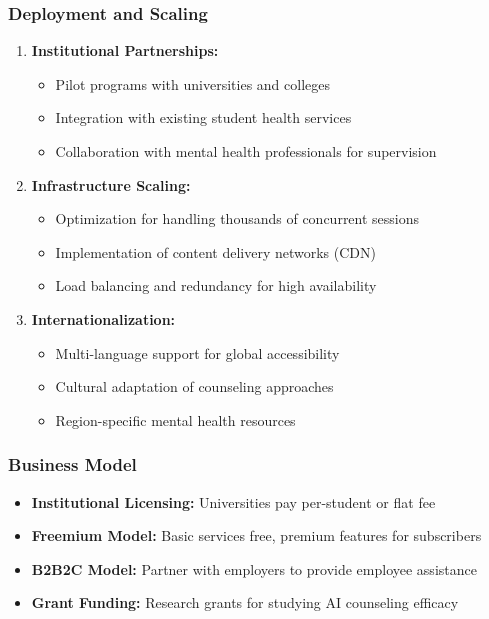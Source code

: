 \documentclass[11pt,a4paper]{article}
\begin{document}
\subsubsection{Deployment and Scaling}
\begin{enumerate}
    \item \textbf{Institutional Partnerships:}
    \begin{itemize}
        \item Pilot programs with universities and colleges
        \item Integration with existing student health services
        \item Collaboration with mental health professionals for supervision
    \end{itemize}
    
    \item \textbf{Infrastructure Scaling:}
    \begin{itemize}
        \item Optimization for handling thousands of concurrent sessions
        \item Implementation of content delivery networks (CDN)
        \item Load balancing and redundancy for high availability
    \end{itemize}
    
    \item \textbf{Internationalization:}
    \begin{itemize}
        \item Multi-language support for global accessibility
        \item Cultural adaptation of counseling approaches
        \item Region-specific mental health resources
    \end{itemize}
\end{enumerate}

\subsubsection{Business Model}
\begin{itemize}
    \item \textbf{Institutional Licensing:} Universities pay per-student or flat fee
    \item \textbf{Freemium Model:} Basic services free, premium features for subscribers
    \item \textbf{B2B2C Model:} Partner with employers to provide employee assistance
    \item \textbf{Grant Funding:} Research grants for studying AI counseling efficacy
\end{itemize}
\end{document}
